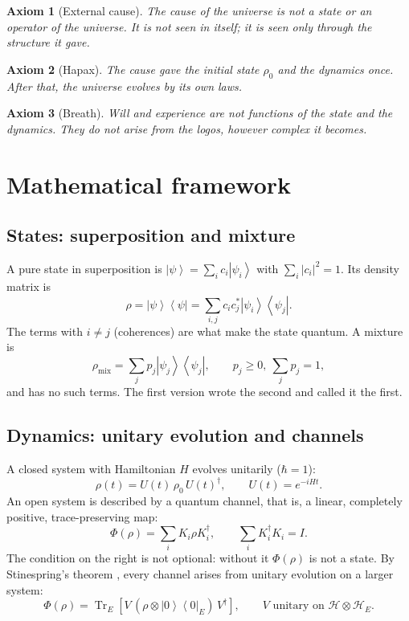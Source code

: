 \documentclass[a4paper,11pt]{article}
\newtheorem{axiom}{Axiom}
\theoremstyle{definition}
\newcommand{\ket}[1]{\left|#1\right\rangle}
\newcommand{\bra}[1]{\left\langle#1\right|}
\newcommand{\Tr}{\operatorname{Tr}}
\begin{document}
\begin{axiom}[External cause]
The cause of the universe is not a state or an operator of the universe. It is not seen in itself; it is seen only through the structure it gave.
\end{axiom}

\begin{axiom}[Hapax]
The cause gave the initial state $\rho_0$ and the dynamics once. After that, the universe evolves by its own laws.
\end{axiom}

\begin{axiom}[Breath]
Will and experience are not functions of the state and the dynamics. They do not arise from the \emph{logos}, however complex it becomes.
\end{axiom}

\section{Mathematical framework}

\subsection{States: superposition and mixture}\label{sec:states}

A pure state in superposition is $\ket{\psi}=\sum_i c_i\ket{\psi_i}$ with $\sum_i|c_i|^2=1$. Its density matrix is
\begin{equation}
\rho=\ket{\psi}\bra{\psi}=\sum_{i,j}c_ic_j^*\ket{\psi_i}\bra{\psi_j}.
\end{equation}
The terms with $i\neq j$ (coherences) are what make the state quantum. A mixture is
\begin{equation}
\rho_{\text{mix}}=\sum_j p_j\ket{\psi_j}\bra{\psi_j},\qquad p_j\ge 0,\ \sum_j p_j=1,
\end{equation}
and has no such terms. The first version wrote the second and called it the first.

\subsection{Dynamics: unitary evolution and channels}

A closed system with Hamiltonian $H$ evolves unitarily ($\hbar=1$):
\begin{equation}\label{eq:unitary}
\rho(t)=U(t)\,\rho_0\,U(t)^\dagger,\qquad U(t)=e^{-iHt}.
\end{equation}
An open system is described by a quantum channel, that is, a linear, completely positive, trace-preserving map:
\begin{equation}\label{eq:channel}
\Phi(\rho)=\sum_i K_i\rho K_i^\dagger,\qquad \sum_i K_i^\dagger K_i=I.
\end{equation}
The condition on the right is not optional: without it $\Phi(\rho)$ is not a state. By Stinespring's theorem \cite{stinespring}, every channel arises from unitary evolution on a larger system:
\begin{equation}\label{eq:stinespring}
\Phi(\rho)=\Tr_E\!\left[V\,(\rho\otimes\ket{0}\bra{0}_E)\,V^\dagger\right],\qquad V \text{ unitary on } \mathcal H\otimes\mathcal H_E .
\end{equation}
\end{document}
